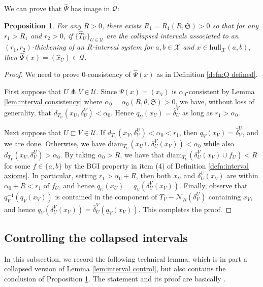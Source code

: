 \documentclass{amsart}
\newtheorem{proposition}[theorem]{Proposition}
\theoremstyle{definition}
\theoremstyle{remark}
\theoremstyle{definition}
\newcommand{\calQ}{\mathcal{Q}}
\newcommand{\calU}{\mathcal{U}}
\newcommand{\calX}{\mathcal{X}}
\newcommand{\hT}{\widehat{T}}
\newcommand{\hx}{\hat{x}}
\newcommand{\hd}{\hat{\delta}}
\newcommand{\hPsi}{\widehat{\Psi}}
\newcommand{\diam}{\mathrm{diam}}
\newcommand{\hull}{\mathrm{hull}}
\newcommand{\nest}{\sqsubset}
\begin{document}
We can prove that $\hPsi$ has image in $\calQ$:

\begin{proposition}\label{prop:hPsi defined}
For any $R>0$,  there exists $R_1 = R_1(R,\mathfrak S)>0$ so that for any $r_1 > R_1$ and $r_2>0$, if $\{\hT_U\}_{U \in \calU}$ are the collapsed intervals associated to an $(r_1,r_2)$-thickening of an $R$-interval system for $a,b \in \calX$ and $x \in \hull_{\calX}(a,b)$, then $\hPsi(x) = (\hx_U) \in \calQ$.
\end{proposition}

\begin{proof}
We need to prove $0$-consistency of $\hPsi(x)$ as in Definition \ref{defn:Q defined}.

First suppose that $U \pitchfork V \in \calU$.  Since $\Psi(x) = (x_V)$ is $\alpha_0$-consistent by Lemma \ref{lem:interval consistency} where $\alpha_0=\alpha_0(R,\theta,\mathfrak S)>0$, we have, without loss of generality, that $d_{T_U}(x_U, \delta^V_U)< \alpha_0$.  Hence $q_U(x_U) = \hd^V_U$ as long as $r_1 > \alpha_0$.  

Next suppose that $U \nest V \in \calU$.  If $d_{T_V}(x_V, \delta^U_V)< \alpha_0 < r_1$, then $q_V(x_V) = \hd^U_V$, and we are done.  Otherwise, we have $\diam_{T_U}(x_U \cup \delta^V_U(x_V))<\alpha_0$ while also $d_{T_V}(x_V, \delta^U_V)>\alpha_0$.  By taking $\alpha_0 > R$, we have that $\diam_{T_U}(\delta^V_U(x_V)\cup f_U)< R$ for some $f \in \{a,b\}$ by the BGI property in item (4) of Definition \ref{defn:interval axioms}.  In particular, setting $r_1>\alpha_0 + R$, then both $x_U$ and $\delta^V_U(x_V)$ are within $\alpha_0 + R< r_1$ of $f_U$, and hence $q_U(x_U) = q_V(\delta^V_U(x_V))$.  Finally, observe that $q^{-1}_V(q_V(x_V))$ is contained in the component of $T_V - \mathcal{N}_{R}(\delta^U_V)$ containing $x_V$, and hence $q_V(\delta^V_U(x_V)) = \hd^V_U(q_V(x_V))$.  This completes the proof.
\end{proof}

\subsection{Controlling the collapsed intervals}

In this subsection, we record the following technical lemma, which is in part a collapsed version of Lemma \ref{lem:interval control}, but also contains the conclusion of Proposition \ref{prop:hPsi defined}.  The statement and its proof are basically \cite[Lemma 7.13]{Dur_infcube}.
\end{document}
